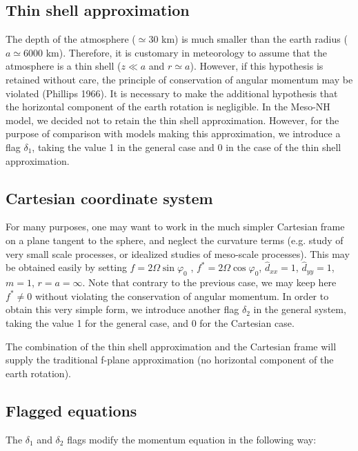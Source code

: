 \subsection{Thin shell approximation}

The depth of the atmosphere ($\simeq 30$ km) is much smaller than the earth
radius ($a \simeq 6000 $ km). Therefore, it is customary in meteorology
to assume that the atmosphere is a thin shell ($z \ll a$ and $r \simeq a$).
However, if this hypothesis is retained without care, the principle of
conservation of angular momentum may be violated (Phillips 1966).
It is necessary to make the additional hypothesis that the horizontal
component of the earth rotation is negligible. In the Meso-NH model, we
decided not to retain the thin shell approximation. However, for the
purpose of comparison with models making this approximation,
we introduce a flag $\delta_1$, taking the value 1 in the general case
and 0 in the case of the thin shell approximation.

\subsection{Cartesian coordinate system}

For many purposes, one may want to work in the much simpler
Cartesian frame on a plane tangent to the sphere,
and neglect the curvature terms (e.g. study of very small
scale processes, or idealized studies of meso-scale processes). This may be
obtained easily by setting $f=2 \Omega \sin \varphi _{0}$ ,
$f^{*}=2 \Omega \cos \varphi _{0}$, $\widehat{d}_{xx}=1$, $\widehat{d}_{yy}=1$,
$m=1$, $r=a=\infty$.
Note that contrary to the previous case, we may keep here $f^{*} \neq 0$
without violating the conservation of angular momentum.
In order to obtain this very simple form, we introduce another flag
$\delta_2$ in the general system, taking the value 1 for the general case,
and 0 for the Cartesian case.

The combination of the thin shell approximation and the Cartesian frame
will supply the traditional f-plane approximation (no horizontal component
of the earth rotation).

\subsection{Flagged equations}

The $\delta_1$ and $\delta_2$ flags modify the momentum equation in the
following way:

